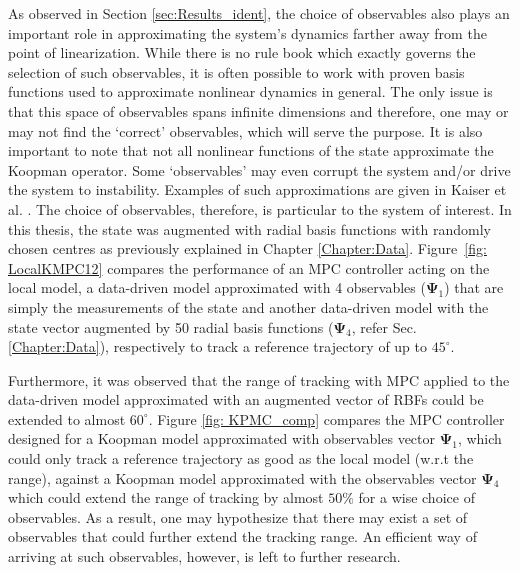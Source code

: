 % 
As observed in Section \ref{sec:Results_ident}, the choice of observables also plays an important role in approximating the system's dynamics farther away from the point of linearization. While there is no rule book which exactly governs the selection of such observables, it is often possible to work with proven basis functions used to approximate nonlinear dynamics in general. The only issue is that this space of observables spans infinite dimensions and therefore, one may or may not find the `correct' observables, which will serve the purpose. It is also important to note that not all nonlinear functions of the state approximate the Koopman operator. Some `observables' may even corrupt the system and/or drive the system to instability. Examples of such approximations are given in Kaiser et al. \cite{kaiser2020datadriven}. The choice of observables, therefore, is particular to the system of interest. In this thesis, the state was augmented with radial basis functions with randomly chosen centres as previously explained in Chapter \ref{Chapter:Data}. Figure~\ref{fig: LocalKMPC12} compares the performance of an MPC controller acting on the local model, a data-driven model approximated with 4 observables ($\mathbf{\Psi}_1$) that are simply the measurements of the state and another data-driven model with the state vector augmented by 50 radial basis functions ($\mathbf{\Psi}_4$, refer Sec. \ref{Chapter:Data}), respectively to track a reference trajectory of up to $45^\circ$. \par
Furthermore, it was observed that the range of tracking with MPC applied to the data-driven model approximated with an augmented vector of RBFs could be extended to almost $60^{\circ}$. Figure \ref{fig: KPMC_comp} compares the MPC controller designed for a Koopman model approximated with observables vector $\mathbf{\Psi}_1$, which could only track a reference trajectory as good as the local model (w.r.t the range), against a Koopman model approximated with the observables vector $\mathbf{\Psi}_4$ which could extend the range of tracking by almost $50\%$ for a wise choice of observables. As a result, one may hypothesize that there may exist a set of observables that could further extend the tracking range. An efficient way of arriving at such observables, however, is left to further research.
% 
